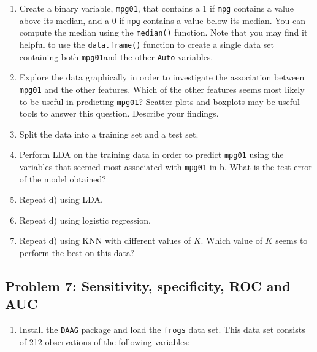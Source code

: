 \documentclass[]{article}
\providecommand{\tightlist}{%
  \setlength{\itemsep}{0pt}\setlength{\parskip}{0pt}}
\begin{document}
\begin{enumerate}
\def\labelenumi{\alph{enumi}.}
\tightlist
\item
  Create a binary variable, \texttt{mpg01}, that contains a 1 if
  \texttt{mpg} contains a value above its median, and a 0 if
  \texttt{mpg} contains a value below its median. You can compute the
  median using the \texttt{median()} function. Note that you may find it
  helpful to use the \texttt{data.frame()} function to create a single
  data set containing both \texttt{mpg01}and the other \texttt{Auto}
  variables.
\item
  Explore the data graphically in order to investigate the association
  between \texttt{mpg01} and the other features. Which of the other
  features seems most likely to be useful in predicting \texttt{mpg01}?
  Scatter plots and boxplots may be useful tools to answer this
  question. Describe your findings.
\item
  Split the data into a training set and a test set.
\item
  Perform LDA on the training data in order to predict \texttt{mpg01}
  using the variables that seemed most associated with \texttt{mpg01} in
  b. What is the test error of the model obtained?
\item
  Repeat d) using LDA.
\item
  Repeat d) using logistic regression.
\item
  Repeat d) using KNN with different values of \(K\). Which value of
  \(K\) seems to perform the best on this data?
\end{enumerate}

\subsection{Problem 7: Sensitivity, specificity, ROC and
AUC}\label{problem-7-sensitivity-specificity-roc-and-auc}

\begin{enumerate}
\def\labelenumi{\alph{enumi}.}
\tightlist
\item
  Install the \texttt{DAAG} package and load the \texttt{frogs} data
  set. This data set consists of 212 observations of the following
  variables:
\end{enumerate}
\end{document}
